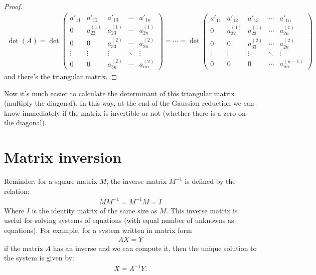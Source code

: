 \begin{proof}
\begin{align*}
\det(A)=
\det\begin{pmatrix}
a'_{11} & a'_{12} & a'_{13} & \cdots & a'_{1n} \\
0 & a^{(1)}_{22} & a^{(1)}_{23} & \cdots & a^{(1)}_{2n} \\
0 & 0 & a^{(2)}_{33} & \cdots & a^{(2)}_{2n} \\
\vdots & \vdots & \vdots & \ddots & \vdots \\
0 & 0 & a^{(2)}_{3n} & \cdots & a^{(2)}_{nn}
\end{pmatrix}
=
\cdots
=
\det\begin{pmatrix}
a'_{11} & a'_{12} & a'_{13} & \cdots & a'_{1n} \\
0 & a^{(1)}_{22}  & a^{(1)}_{23} & \cdots & a^{(1)}_{2n} \\
0 & 0 & a^{(2)}_{33} & \cdots & a^{(2)}_{2n} \\
\vdots & \vdots & \vdots & \ddots & \vdots \\
0 & 0 & 0 & \cdots & a^{(n-1)}_{nn}
\end{pmatrix}
\end{align*}
and there's the triangular matrix.

\end{proof}

\noindent Now it's much easier to calculate the determinant of this triangular matrix (multiply the diagonal). In this way, at the end of the Gaussian reduction we can know immediately if the matrix is invertible or not (whether there is a zero on the diagonal).



\section{Matrix inversion}

Reminder: for a square matrix $M$, the inverse matrix $M^{-1}$ is defined by the relation:
\begin{align*}
M M^{-1} = M^{-1} M = I
\end{align*}
Where $I$ is the identity matrix of the same size as $M$. This inverse matrix is useful for solving systems of equations (with equal number of unknowns as equations). For example, for a system written in matrix form
\begin{align*}
AX = Y
\end{align*}
if the matrix $A$ has an inverse and we can compute it, then the unique solution to the
system is given by:
\begin{align*}
X = A^{-1}Y.
\end{align*}

